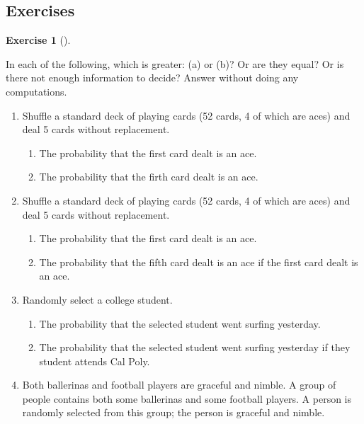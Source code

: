\documentclass[
  letterpaper,
  DIV=11,
  numbers=noendperiod]{scrreprt}
\providecommand{\tightlist}{%
  \setlength{\itemsep}{0pt}\setlength{\parskip}{0pt}}
\theoremstyle{plain}
\theoremstyle{definition}
\theoremstyle{definition}
\newtheorem{exercise}{Exercise}[chapter]
\theoremstyle{definition}
\theoremstyle{remark}
\begin{document}

\subsection{Exercises}\label{exercises-4}

\begin{exercise}[]\protect\hypertarget{exr-greater-conditioning-literacy}{}\label{exr-greater-conditioning-literacy}

In each of the following, which is greater: (a) or (b)? Or are they
equal? Or is there not enough information to decide? Answer without
doing any computations.

\begin{enumerate}
\def\labelenumi{\arabic{enumi}.}
\tightlist
\item
  Shuffle a standard deck of playing cards (52 cards, 4 of which are
  aces) and deal 5 cards without replacement.

  \begin{enumerate}
  \def\labelenumii{\alph{enumii}.}
  \tightlist
  \item
    The probability that the first card dealt is an ace.
  \item
    The probability that the firth card dealt is an ace.
  \end{enumerate}
\item
  Shuffle a standard deck of playing cards (52 cards, 4 of which are
  aces) and deal 5 cards without replacement.

  \begin{enumerate}
  \def\labelenumii{\alph{enumii}.}
  \tightlist
  \item
    The probability that the first card dealt is an ace.
  \item
    The probability that the fifth card dealt is an ace if the first
    card dealt is an ace.
  \end{enumerate}
\item
  Randomly select a college student.

  \begin{enumerate}
  \def\labelenumii{\alph{enumii}.}
  \tightlist
  \item
    The probability that the selected student went surfing yesterday.
  \item
    The probability that the selected student went surfing yesterday if
    they student attends Cal Poly.
  \end{enumerate}
\item
  Both ballerinas and football players are graceful and nimble. A group
  of people contains both some ballerinas and some football players. A
  person is randomly selected from this group; the person is graceful
  and nimble.


\end{enumerate}
\end{exercise}
\end{document}
